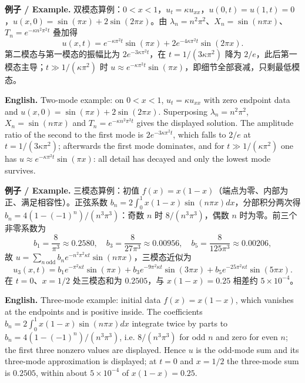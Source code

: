 \documentclass[UTF8,11pt,a4paper]{ctexart}
\newcommand{\EN}[1]{\par\noindent \textbf{English.} #1\par}
\newcommand{\EX}[2]{\par\noindent \textbf{例子 / Example.} #1\par\EN{#2}}
\begin{document}
\EX{双模态算例：$0<x<1$，$u_t=\kappa u_{xx}$，$u(0,t)=u(1,t)=0$，$u(x,0)=\sin(\pi x)+2\sin(2\pi x)$。由 $\lambda_n=n^2\pi^2$、$X_n=\sin(n\pi x)$、$T_n=e^{-\kappa n^2\pi^2t}$ 叠加得
\[
u(x,t)=e^{-\kappa\pi^2t}\sin(\pi x)+2e^{-4\kappa\pi^2t}\sin(2\pi x).
\]
第二模态与第一模态的振幅比为 $2e^{-3\kappa\pi^2t}$，在 $t=1/(3\kappa\pi^2)$ 降为 $2/e$，此后第一模态主导；$t\gg1/(\kappa\pi^2)$ 时 $u\approx e^{-\kappa\pi^2t}\sin(\pi x)$，即细节全部衰减，只剩最低模态。}{Two-mode example: on $0<x<1$, $u_t=\kappa u_{xx}$ with zero endpoint data and $u(x,0)=\sin(\pi x)+2\sin(2\pi x)$. Superposing $\lambda_n=n^2\pi^2$, $X_n=\sin(n\pi x)$ and $T_n=e^{-\kappa n^2\pi^2t}$ gives the displayed solution. The amplitude ratio of the second to the first mode is $2e^{-3\kappa\pi^2t}$, which falls to $2/e$ at $t=1/(3\kappa\pi^2)$; afterwards the first mode dominates, and for $t\gg1/(\kappa\pi^2)$ one has $u\approx e^{-\kappa\pi^2t}\sin(\pi x)$: all detail has decayed and only the lowest mode survives.}
\EX{三模态算例：初值 $f(x)=x(1-x)$（端点为零、内部为正、满足相容性）。正弦系数 $b_n=2\int_0^1x(1-x)\sin(n\pi x)dx$，分部积分两次得 $b_n=4(1-(-1)^n)/(n^3\pi^3)$：奇数 $n$ 时 $8/(n^3\pi^3)$，偶数 $n$ 时为零。前三个非零系数为
\[
b_1=\frac{8}{\pi^3}\approx0.2580,\quad b_3=\frac{8}{27\pi^3}\approx0.00956,\quad b_5=\frac{8}{125\pi^3}\approx0.00206,
\]
故 $u=\sum_{n\ \mathrm{odd}}b_ne^{-n^2\pi^2\kappa t}\sin(n\pi x)$，三模态近似为
\[
u_3(x,t)=b_1e^{-\pi^2\kappa t}\sin(\pi x)+b_3e^{-9\pi^2\kappa t}\sin(3\pi x)+b_5e^{-25\pi^2\kappa t}\sin(5\pi x).
\]
在 $t=0$、$x=1/2$ 处三模态和为 $0.2505$，与 $x(1-x)=0.25$ 相差约 $5\times10^{-4}$。}{Three-mode example: initial data $f(x)=x(1-x)$, which vanishes at the endpoints and is positive inside. The coefficients $b_n=2\int_0^1x(1-x)\sin(n\pi x)dx$ integrate twice by parts to $b_n=4(1-(-1)^n)/(n^3\pi^3)$, i.e. $8/(n^3\pi^3)$ for odd $n$ and zero for even $n$; the first three nonzero values are displayed. Hence $u$ is the odd-mode sum and its three-mode approximation is displayed; at $t=0$ and $x=1/2$ the three-mode sum is $0.2505$, within about $5\times10^{-4}$ of $x(1-x)=0.25$.}
\end{document}
